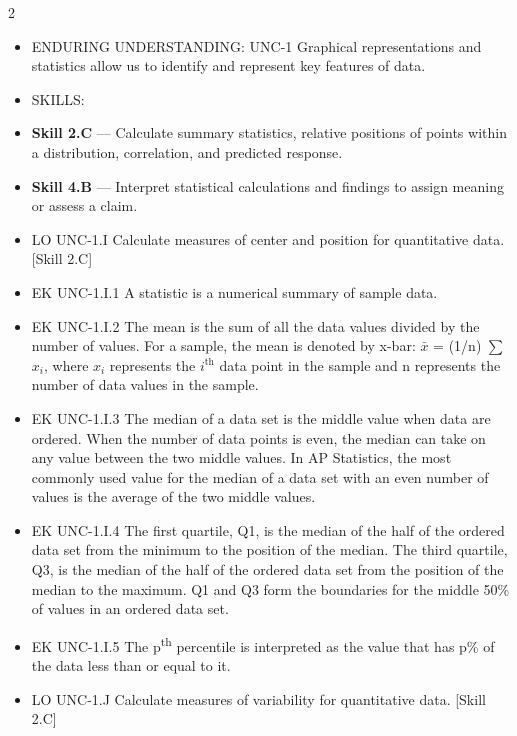 \documentclass[11pt]{article}
\begin{document}

\begin{multicols}{2}
{\footnotesize\setlength{\parskip}{0pt}
\begin{itemize}[leftmargin=*,itemsep=0pt,topsep=0pt]
\item ENDURING UNDERSTANDING: UNC-1 Graphical representations and statistics allow us to identify and represent key features of data.
\item SKILLS:
\item \textbf{Skill 2.C} --- Calculate summary statistics, relative positions of points within a distribution, correlation, and predicted response.
\item \textbf{Skill 4.B} --- Interpret statistical calculations and findings to assign meaning or assess a claim.
\item LO UNC-1.I Calculate measures of center and position for quantitative data. [Skill 2.C]
\item EK UNC-1.I.1 A statistic is a numerical summary of sample data.
\item EK UNC-1.I.2 The mean is the sum of all the data values divided by the number of values. For a sample, the mean is denoted by x-bar: $\bar{x}$ = (1/n) $\sum$ $x_i$, where $x_i$ represents the $i^{\mathrm{th}}$ data point in the sample and n represents the number of data values in the sample.
\item EK UNC-1.I.3 The median of a data set is the middle value when data are ordered. When the number of data points is even, the median can take on any value between the two middle values. In AP Statistics, the most commonly used value for the median of a data set with an even number of values is the average of the two middle values.
\item EK UNC-1.I.4 The first quartile, Q1, is the median of the half of the ordered data set from the minimum to the position of the median. The third quartile, Q3, is the median of the half of the ordered data set from the position of the median to the maximum. Q1 and Q3 form the boundaries for the middle 50\% of values in an ordered data set.
\item EK UNC-1.I.5 The p\textsuperscript{th} percentile is interpreted as the value that has p\% of the data less than or equal to it.
\item LO UNC-1.J Calculate measures of variability for quantitative data. [Skill 2.C]

\end{itemize}}
\end{multicols}
\end{document}
